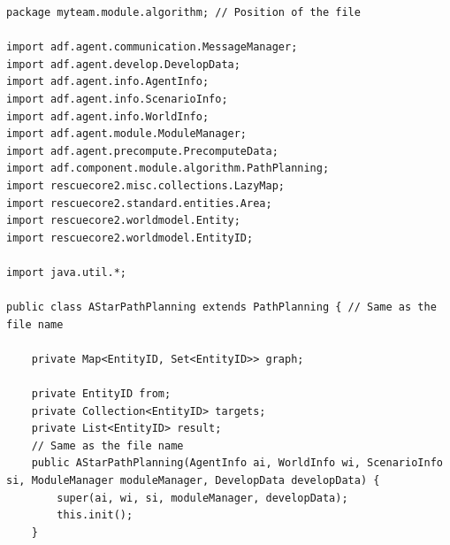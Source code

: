\documentclass[a4paper]{article}
\begin{document}
\begin{lstlisting}[caption=Part of AStarPlanning.java,label=astarpathplan1]
package myteam.module.algorithm; // Position of the file

import adf.agent.communication.MessageManager;
import adf.agent.develop.DevelopData;
import adf.agent.info.AgentInfo;
import adf.agent.info.ScenarioInfo;
import adf.agent.info.WorldInfo;
import adf.agent.module.ModuleManager;
import adf.agent.precompute.PrecomputeData;
import adf.component.module.algorithm.PathPlanning;
import rescuecore2.misc.collections.LazyMap;
import rescuecore2.standard.entities.Area;
import rescuecore2.worldmodel.Entity;
import rescuecore2.worldmodel.EntityID;

import java.util.*;

public class AStarPathPlanning extends PathPlanning { // Same as the file name

    private Map<EntityID, Set<EntityID>> graph;

    private EntityID from;
    private Collection<EntityID> targets;
    private List<EntityID> result;
    // Same as the file name
    public AStarPathPlanning(AgentInfo ai, WorldInfo wi, ScenarioInfo si, ModuleManager moduleManager, DevelopData developData) {
        super(ai, wi, si, moduleManager, developData);
        this.init();
    }
\end{lstlisting}
\end{document}
